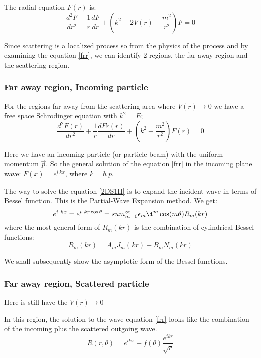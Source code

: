 The radial equation $ F(r) $ is:
\begin{equation}\label{frr}
\frac{d^2 F}{dr^2} + \frac{1}{r}\frac{dF}{dr} + \left(k^2 - 2V(r) - \frac{m^2}{r^2}\right)F = 0
\end{equation}

Since scattering is a localized process so from the physics of the process and by examining the equation \eqref{frr},  we can identify 2 regions, the far away region and the scattering region.


\subsubsection{\textbf{Far away region, Incoming particle}}

For the regions far away from the scattering area where $ V(r) \rightarrow 0 $ we have a free space Schrodinger equation with $ k^2 = E $;
\begin{equation}\label{2DS1H}
\frac{d^2 F(r)}{dr^2} + \frac{1}{r}\frac{d Fr(r)}{dr} + \left(k^2 - \frac{m^2}{r^2}\right)F(r) = 0
\end{equation}
 
Here we have an incoming particle (or particle beam) with the uniform momentum $ \vec{p} $. So the general solution of the equation \eqref{frr} in the incoming plane wave: $  F(x) = e^{i\ kx} $, where $ k = \hbar\ p $.

The way to solve the equation \eqref{2DS1H} is to expand the incident wave in terms of Bessel function. This is the Partial-Wave Expansion method. We get:
\begin{equation}
    e^{i\ kx} = e^{i\ kr\cos\theta} = sum_{m=0}^{\infty}{\epsilon_m\i^m\cos(m\theta)R_m(kr)}
\end{equation}
where the most general form of $ R_m(kr) $ is the combination of cylindrical Bessel functions:
\begin{equation}\label{bss}
    R_m(kr) = A_mJ_m(kr) + B_mN_m(kr)
\end{equation}

We shall subsequently show the asymptotic form of the Bessel functions.

\subsubsection{\textbf{Far away region, Scattered particle}}

Here is still have the $ V(r) \rightarrow 0 $

In this region, the solution to the wave equation \eqref{frr} looks like the combination of the incoming plus the scattered outgoing wave.
\begin{equation}\label{free2D}
    R(r,\theta) = e^{ikx} + f(\theta)\frac{e^{ikr}}{\sqrt{r}}
\end{equation}

